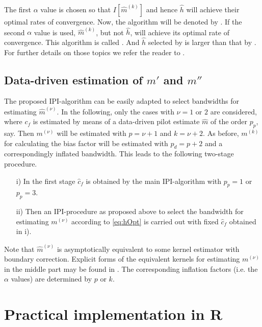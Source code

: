 The first $\alpha$ value is chosen so that $I\left[\hat m^{\left(k\right)}\right]$ and hence $\hat h$ will achieve their optimal rates of convergence. Now, the algorithm will be denoted by . If the second $\alpha$ value is used, $\hat m^{\left(k\right)}$, but not $\hat h$, will achieve its optimal rate of convergence. This algorithm is called . And $\hat h$ selected by   is larger than that by . For further details on those topics we refer the reader to \citet{fenggriesfritz2020}.

\subsection{Data-driven estimation of $m'$ and $m''$} \label{sec:derivEst}

The proposed IPI-algorithm can be easily adapted to select bandwidths for
estimating $\hat m^{\left(\nu\right)}$.  In the following, only the cases with $\nu=1$ or $2$ are considered, where $c_f$ is estimated by means of a data-driven pilot estimate $\hat m$ of the order $p_p$, say. Then $m^{\left(\nu\right)}$ will be estimated with $p=\nu+1$ and $k=\nu+2$. As before, $m^{\left(k\right)}$ for calculating the bias factor will be estimated
with $p_d=p+2$ and a correspondingly inflated bandwidth. This leads to the following two-stage procedure.
\begin{enumerate}
	\item[\enspace\enspace i)] In the first stage $\hat c_f$ is obtained by the main IPI-algorithm with $p_p=1$ or $p_p=3$.
	
	\item[\enspace ii)] Then an IPI-procedure as proposed above to select the bandwidth for estimating $m^{\left(\nu\right)}$ according to \eqref{eq:hOpt} is carried out with fixed $\hat c_f$ obtained in i). 
\end{enumerate}
Note that $\hat m^{\left(\nu\right)}$ is asymptotically equivalent to some kernel estimator with boundary correction. Explicit forms of the equivalent kernels for estimating $m^{\left(\nu\right)}$ in the middle part may be found in \citet{mueller1988}. The corresponding inflation factors (i.e. the $\alpha$ values) are determined by $p$ or $k$. 

\section{Practical implementation in R} \label{sec:implementR}

